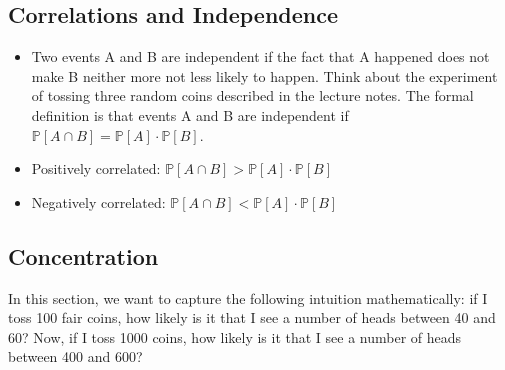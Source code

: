 \documentclass[11pt]{article}
\theoremstyle{definition}
\begin{document}
\subsection{Correlations and Independence}
\begin{itemize}
\item Two events A and B are independent if the fact that A happened does not make B neither more not less likely to happen. Think about the experiment of tossing three random coins described in the lecture notes. The formal definition is that events A and B are independent if
$\mathbb{P} [A\cap B] =  \mathbb{P} [A] \cdot \mathbb{P} [B]$.

\item{Positively correlated: $\mathbb{P} [A\cap B] > \mathbb{P} [A] \cdot \mathbb{P} [B]$}
\item{Negatively correlated: $\mathbb{P} [A\cap B] <  \mathbb{P} [A] \cdot \mathbb{P} [B]$}
\end{itemize}


\subsection{Concentration}
In this section, we want to capture the following intuition mathematically: if I toss 100 fair coins, how likely is it that I see a number of heads between 40 and 60? Now, if I toss 1000 coins, how likely is it that I see a number of heads between 400 and 600?
\end{document}
